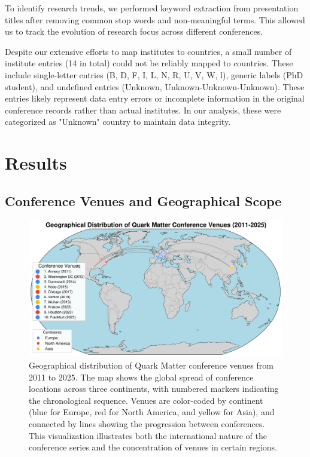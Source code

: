 \documentclass[a4paper,11pt]{article}
\begin{document}
To identify research trends, we performed keyword extraction from presentation titles after removing common stop words and non-meaningful terms. This allowed us to track the evolution of research focus across different conferences.

Despite our extensive efforts to map institutes to countries, a small number of institute entries (14 in total) could not be reliably mapped to countries. These include single-letter entries (B, D, F, I, L, N, R, U, V, W, l), generic labels (PhD student), and undefined entries (Unknown, Unknown-Unknown-Unknown). These entries likely represent data entry errors or incomplete information in the original conference records rather than actual institutes. In our analysis, these were categorized as "Unknown" country to maintain data integrity.

\section{Results}

\subsection{Conference Venues and Geographical Scope}

\begin{figure}[H]
\centering
\includegraphics[width=\textwidth]{figures/conference_venues.pdf}
\caption{Geographical distribution of Quark Matter conference venues from 2011 to 2025. The map shows the global spread of conference locations across three continents, with numbered markers indicating the chronological sequence. Venues are color-coded by continent (blue for Europe, red for North America, and yellow for Asia), and connected by lines showing the progression between conferences. This visualization illustrates both the international nature of the conference series and the concentration of venues in certain regions.}
\label{fig:venues}
\end{figure}
\end{document}
